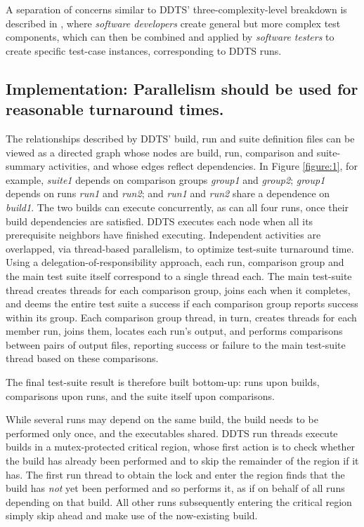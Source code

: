 \documentclass[conference]{IEEEtran}
\begin{document}
A separation of concerns similar to DDTS' three-complexity-level breakdown is described in \cite{rest}, where \emph{software developers} create general but more complex test components, which can then be combined and applied by \emph{software testers} to create specific test-case instances, corresponding to DDTS runs.

\subsection{Implementation: Parallelism should be used for reasonable turnaround times.}

The relationships described by DDTS' build, run and suite definition files can be viewed as a directed graph whose nodes are build, run, comparison and suite-summary activities, and whose edges reflect dependencies. In Figure \ref{figure:1}, for example, \emph{suite1} depends on comparison groups \emph{group1} and \emph{group2}; \emph{group1} depends on runs \emph{run1} and \emph{run2}; and \emph{run1} and \emph{run2} share a dependence on \emph{build1}. The two builds can execute concurrently, as can all four runs, once their build dependencies are satisfied. DDTS executes each node when all its prerequisite neighbors have finished executing. Independent activities are overlapped, via thread-based parallelism, to optimize test-suite turnaround time. Using a delegation-of-responsibility approach, each run, comparison group and the main test suite itself correspond to a single thread each. The main test-suite thread creates threads for each comparison group, joins each when it completes, and deems the entire test suite a success if each comparison group reports success within its group. Each comparison group thread, in turn, creates threads for each member run, joins them, locates each run's output, and performs comparisons between pairs of output files, reporting success or failure to the main test-suite thread based on these comparisons.

The final test-suite result is therefore built bottom-up: runs upon builds, comparisons upon runs, and the suite itself upon comparisons.

While several runs may depend on the same build, the build needs to be performed only once, and the executables shared. DDTS run threads execute builds in a mutex-protected critical region, whose first action is to check whether the build has already been performed and to skip the remainder of the region if it has. The first run thread to obtain the lock and enter the region finds that the build has \emph{not} yet been performed and so performs it, as if on behalf of all runs depending on that build. All other runs subsequently entering the critical region simply skip ahead and make use of the now-existing build.
\end{document}
